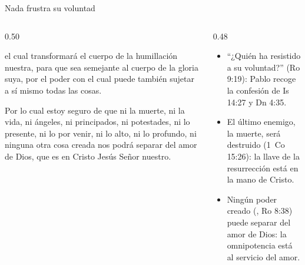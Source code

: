 \begin{frame}{Nada frustra su voluntad}
\begin{columns}[t,onlytextwidth]
\begin{column}{0.50\textwidth}
\begin{cita}[fontupper=\scriptsize\itshape]el cual transformará el cuerpo de la humillación nuestra, para que sea semejante al cuerpo de la gloria suya, por el poder con el cual puede también sujetar a sí mismo todas las cosas.\end{cita}
\begin{cita}[fontupper=\scriptsize\itshape]Por lo cual estoy seguro de que ni la muerte, ni la vida, ni ángeles, ni principados, ni potestades, ni lo presente, ni lo por venir, ni lo alto, ni lo profundo, ni ninguna otra cosa creada nos podrá separar del amor de Dios, que es en Cristo Jesús Señor nuestro.\end{cita}
\end{column}
\begin{column}{0.48\textwidth}\small
\begin{itemize}
\item ``¿Quién ha resistido a su voluntad?'' (Ro 9:19): Pablo recoge la confesión de Is 14:27 y Dn 4:35.
\item El último enemigo, la muerte, será destruido (1~Co 15:26): la llave de la resurrección está en la mano de Cristo.
\item Ningún poder creado (, Ro 8:38) puede separar del amor de Dios: la omnipotencia está al servicio del amor.
\end{itemize}
\end{column}
\end{columns}
\end{frame}

